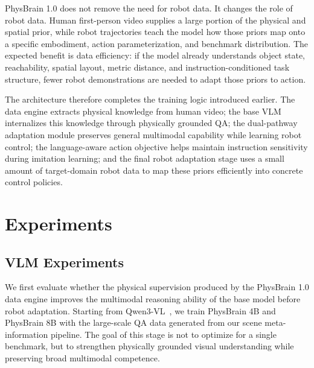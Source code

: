 PhysBrain 1.0 does not remove the need for robot data. It changes the role of robot data. Human first-person video supplies a large portion of the physical and spatial prior, while robot trajectories teach the model how those priors map onto a specific embodiment, action parameterization, and benchmark distribution. The expected benefit is data efficiency: if the model already understands object state, reachability, spatial layout, metric distance, and instruction-conditioned task structure, fewer robot demonstrations are needed to adapt those priors to action.

The architecture therefore completes the training logic introduced earlier. The data engine extracts physical knowledge from human video; the base VLM internalizes this knowledge through physically grounded QA; the dual-pathway adaptation module preserves general multimodal capability while learning robot control; the language-aware action objective helps maintain instruction sensitivity during imitation learning; and the final robot adaptation stage uses a small amount of target-domain robot data to map these priors efficiently into concrete control policies.



\section{Experiments}
\label{sec:experiments}



\subsection{VLM Experiments}
\label{subsec:vlm_exp}

We first evaluate whether the physical supervision produced by the PhysBrain 1.0 data engine improves the multimodal reasoning ability of the base model before robot adaptation. Starting from Qwen3-VL~\cite{Qwen3-VL_2025_arXiv}, we train PhysBrain 4B and PhysBrain 8B with the large-scale QA data generated from our scene meta-information pipeline. The goal of this stage is not to optimize for a single benchmark, but to strengthen physically grounded visual understanding while preserving broad multimodal competence.

